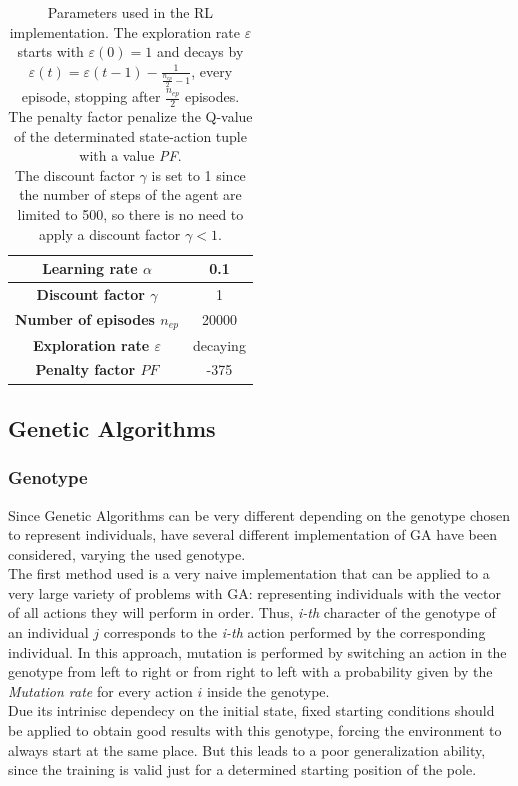 \begin{table}[H]%
	\centering
	\label{tab:RL_parameters}
	\begin{tabular}{|S|S|} 		%
		
		\hline
		{\textbf{Learning rate $\alpha$}} &  {0.1} \\
		\hline
		{\textbf{Discount factor $\gamma$}} & {1} \\
		\hline
		{\textbf{Number of episodes $n_{ep}$}} & {20000} \\
		\hline
		{\textbf{Exploration rate $\varepsilon$}}  & {decaying} \\
		\hline
		{\textbf{Penalty factor $PF$}}& {-375} \\
		\hline
		
	\end{tabular}
	\caption{Parameters used in the RL implementation. The exploration rate $\varepsilon$ starts with $\varepsilon(0)=1$ and decays by $\varepsilon(t) = \varepsilon(t - 1) - \frac{1}{\frac{n_{ep}}{2} - 1}$, every episode, stopping after $\frac{n_{ep}}{2}$ episodes. \\
	The penalty factor penalize the Q-value of the determinated state-action tuple with a value \textit{PF}.\\
	The discount factor $\gamma$ is set to 1 since the number of steps of the agent are limited to 500, so there is no need to apply a discount factor $\gamma < 1$.
	}
\end{table}



\subsection{Genetic Algorithms}

\subsubsection{Genotype}
Since Genetic Algorithms can be very different depending on the genotype chosen to represent individuals, have  several different implementation of GA have been considered, varying the used genotype.
\\


The first method used is a very naive implementation that can be applied to a very large variety of problems with GA: representing individuals with the vector of all actions they will perform in order.
Thus, \textit{i-th} character of the genotype of an individual $j$ corresponds to the \textit{i-th} action performed by the corresponding individual.
In this approach, mutation is performed by switching an action in the genotype from left to right or from right to left with a probability given by the \textit{Mutation rate} for every action $i$ inside the genotype.
\\
Due its intrinisc dependecy on the initial state, fixed starting conditions should be applied to obtain good results with this genotype, forcing the environment to always start at the same place. 
But this leads to a poor generalization ability, since the training is valid just for a determined starting position of the pole.

